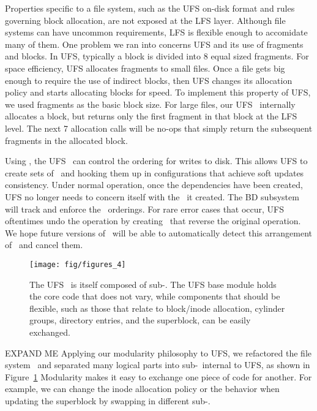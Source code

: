 Properties specific to a file system, such as the UFS on-disk format and rules
governing block allocation, are not exposed at the LFS layer.  Although file
systems can have uncommon requirements, LFS is flexible enough to accomidate
many of them. One problem we ran into concerns UFS and its use of fragments
and blocks. In UFS, typically a block is divided into 8 equal sized fragments.
For space efficiency, UFS allocates fragments to small files. Once a file gets
big enough to require the use of indirect blocks, then UFS changes its
allocation policy and starts allocating blocks for speed. To implement this
property of UFS, we used fragments as the basic block size. For large files,
our UFS \module\ internally allocates a block, but returns only the first
fragment in that block at the LFS level. The next 7 allocation calls will be
no-ops that simply return the subsequent fragments in the allocated block.

Using \chdescs, the UFS \module\ can control the ordering for writes to disk.
This allows UFS to create sets of \chdescs\ and hooking them up in
configurations that achieve soft updates consistency. Under normal operation,
once the dependencies have been created, UFS no longer needs to concern itself
with the \chdescs\ it created. The BD subsystem will track and enforce the
\chdesc\ orderings. For rare error cases that occur, UFS oftentimes
undo the operation by creating \chdescs\ that reverse the original operation.
We hope future versions of \Kudos\ will be able to automatically detect this
arrangement of \chdescs\ and cancel them.

\begin{figure}[tb]
  \centering
  \texttt{[image: fig/figures\_4]}
  \caption{\label{fig:ufsmodules} The UFS \module\ is itself composed of
  sub-\modules. The UFS base module holds the core code that does not vary,
  while components that should be flexible, such as those that relate to
  block/inode allocation, cylinder groups, directory entries, and the
  superblock, can be easily exchanged.}
\end{figure}

EXPAND ME
Applying our modularity philosophy to UFS, we refactored the file system
\module\ and separated many logical parts into sub-\modules\ internal to UFS,
as shown in Figure~\ref{fig:ufsmodules}
Modularity makes it easy to exchange one piece of code for another. For
example, we can change the inode allocation policy or the behavior when
updating the superblock by swapping in different sub-\module.


